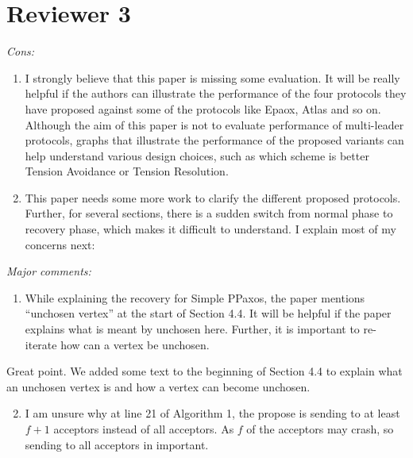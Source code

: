 \documentclass[letterpaper,twocolumn,10pt]{article}
\newenvironment{reviewerquote}
{\list{}{\leftmargin=\parindent\rightmargin=0in}\item[] \itshape \color{ReviewerDarkGray}}%
{\endlist}
\begin{document}
\section*{Reviewer 3}
\begin{reviewerquote}
  Cons:

  \begin{enumerate}
    \setcounter{enumi}{0}
    \item
      I strongly believe that this paper is missing some evaluation. It will be
      really helpful if the authors can illustrate the performance of the four
      protocols they have proposed against some of the protocols like Epaox,
      Atlas and so on. Although the aim of this paper is not to evaluate
      performance of multi-leader protocols, graphs that illustrate the
      performance of the proposed variants can help understand various design
      choices, such as which scheme is better Tension Avoidance or Tension
      Resolution.
    \item
      This paper needs some more work to clarify the different proposed
      protocols. Further, for several sections, there is a sudden switch from
      normal phase to recovery phase, which makes it difficult to understand. I
      explain most of my concerns next:
  \end{enumerate}
\end{reviewerquote}


\begin{reviewerquote}
  Major comments:

  \begin{enumerate}
    \setcounter{enumi}{0}
    \item
      While explaining the recovery for Simple PPaxos, the paper mentions
      ``unchosen vertex'' at the start of Section 4.4. It will be helpful if
      the paper explains what is meant by unchosen here. Further, it is
      important to re-iterate how can a vertex be unchosen.
  \end{enumerate}
\end{reviewerquote}

Great point. We added some text to the beginning of Section 4.4 to explain what
an unchosen vertex is and how a vertex can become unchosen.

\begin{reviewerquote}
  \begin{enumerate}
    \setcounter{enumi}{1}
    \item
      I am unsure why at line 21 of Algorithm 1, the propose is sending to at
      least $f+1$ acceptors instead of all acceptors. As $f$ of the acceptors
      may crash, so sending to all acceptors in important.
  \end{enumerate}
\end{reviewerquote}
\end{document}
